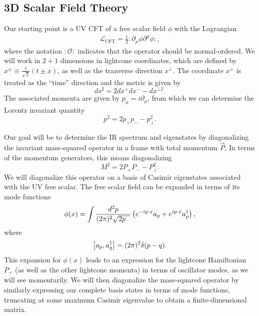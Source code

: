 
\subsection{3D Scalar Field Theory}

Our starting point is a UV CFT of a free scalar field $\phi$ with the Lagrangian 
\begin{equation}
    \begin{aligned}
        \mathcal{L}_{\textrm{CFT}} = \frac{1}{2} : \partial_\mu \phi \partial^\mu \phi :,
    \end{aligned}
\end{equation} 
where the notation $: \mathcal{O} : $ indicates that the operator should be 
normal-ordered. We will work in $2+1$ dimensions in lightcone coordinates, which 
are defined by $x^{\pm} \equiv \frac{1}{\sqrt{2}}(t \pm x)$, as well as the 
tranverse direction $x^\bot$. The coordinate $x^+$ is treated as the ``time'' 
direction and the metric is given by 
\begin{equation}
    ds^2 = 2 dx^+ dx^- - dx^{\bot 2}.
\end{equation} 
The associated momenta are given by $p_\mu = i \partial_\mu$, from which we can 
determine the Lorentz invariant quantity 
\begin{equation}
    p^2 = 2 p_+ p_- - p_\bot^2.
\end{equation}

Our goal will be to determine the IR spectrum and eigenstates by diagonalizing 
the invariant mass-squared operator in a frame with total momentum $\vec{P}$. 
In terms of the momentum generators, this means diagonalizing 
\begin{equation}
    M^2 = 2 P_+ P_- - P_\bot^2.
\end{equation} 
We will diagonalize this operator on a basis of Casimir eigenstates associated 
with the UV free scalar. The free scalar field can be expanded in terms of its 
mode functions 
\begin{equation}
    \phi(x) = \int \frac{d^2 p}{(2\pi)^2 \sqrt{2 p_-}} \left( e^{-i p \cdot x} a_p + e^{i p \cdot x} a^\dagger_p \right),
\end{equation} 
where 
\begin{equation}
    \left[ a_p, a^\dagger_q \right] = (2\pi)^2 \delta(p-q).
\end{equation} 
This expansion for $\phi(x)$ leads to an expression for the lightcone 
Hamiltonian $P_+$ (as well as the other lightcone momenta) in terms of 
oscillator modes, as we will see momentarily. We will then diagonalize the 
mass-squared operator by similarly expressing our complete basis states in terms 
of mode functions, truncating at some maximum Casimir eigenvalue to obtain a 
finite-dimensional matrix.

